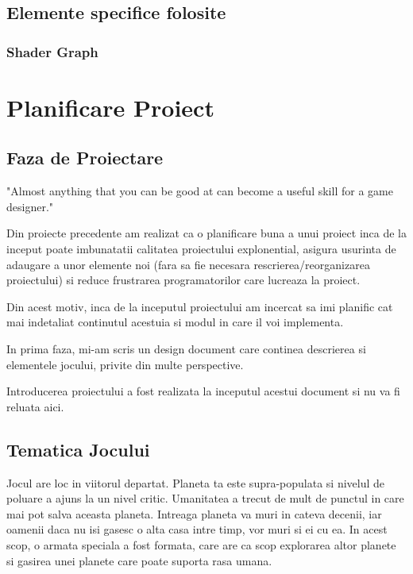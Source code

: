 \documentclass[12pt, a4paper]{article}
\begin{document}
	\subsection{Elemente specifice folosite}	
	
	\subsubsection{Shader Graph}
	
	
	
	
	
	\section{Planificare Proiect}
	
	\subsection{Faza de Proiectare}
	
	"Almost anything that you can be good at can become a useful
	skill for a game designer." \cite{bookOfLenses}
	
	Din proiecte precedente am realizat ca o planificare buna a unui proiect inca de la inceput poate imbunatatii calitatea proiectului explonential, asigura usurinta de adaugare a unor elemente noi (fara sa fie necesara rescrierea/reorganizarea proiectului) si reduce frustrarea programatorilor care lucreaza la proiect.
	
	Din acest motiv, inca de la inceputul proiectului am incercat sa imi planific cat mai indetaliat continutul acestuia si modul in care il voi implementa.
	
	In prima faza, mi-am scris un design document care continea descrierea si elementele jocului, privite din multe perspective.
	
	Introducerea proiectului a fost realizata la inceputul acestui document si nu va fi reluata aici.
	
	
	
	\subsection{Tematica Jocului}
	
	Jocul are loc in viitorul departat. Planeta ta este supra-populata si nivelul de poluare a ajuns la un nivel critic. Umanitatea a trecut de mult de punctul in care mai pot salva aceasta planeta. Intreaga planeta va muri in cateva decenii, iar oamenii daca nu isi gasesc o alta casa intre timp, vor muri si ei cu ea. In acest scop, o armata speciala a fost formata, care are ca scop explorarea altor planete si gasirea unei planete care poate suporta rasa umana.
	
\end{document}
